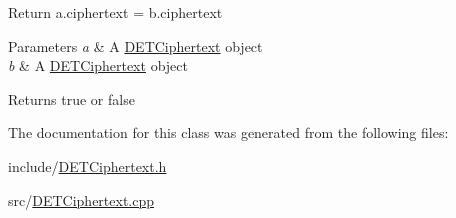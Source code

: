 Return {\ttfamily a.\+ciphertext} = {\ttfamily b.\+ciphertext} 
\begin{DoxyParams}{Parameters}
{\em a} & A {\ttfamily \hyperlink{classDETCiphertext}{D\+E\+T\+Ciphertext}} object \\
\hline
{\em b} & A {\ttfamily \hyperlink{classDETCiphertext}{D\+E\+T\+Ciphertext}} object \\
\hline
\end{DoxyParams}
\begin{DoxyReturn}{Returns}
{\ttfamily true} or {\ttfamily false} 
\end{DoxyReturn}


The documentation for this class was generated from the following files\+:\begin{DoxyCompactItemize}
\item 
include/\hyperlink{DETCiphertext_8h}{D\+E\+T\+Ciphertext.\+h}\item 
src/\hyperlink{DETCiphertext_8cpp}{D\+E\+T\+Ciphertext.\+cpp}\end{DoxyCompactItemize}
